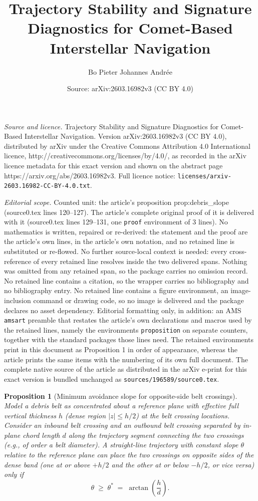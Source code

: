 \documentclass[10pt,a4paper]{amsart}
\title{Trajectory Stability and Signature Diagnostics for Comet-Based Interstellar Navigation}
\author{Bo Pieter Johannes Andr\'ee}
\date{Source: arXiv:2603.16982v3 (CC BY 4.0)}
\newtheorem{proposition}{Proposition}
\begin{document}
\maketitle

\noindent\emph{Source and licence.} Trajectory Stability and Signature Diagnostics for Comet-Based Interstellar Navigation. Version arXiv:2603.16982v3 (CC BY 4.0), distributed by arXiv under the Creative Commons Attribution 4.0 International licence, http://creativecommons.org/licenses/by/4.0/, as recorded in the arXiv licence metadata for this exact version and shown on the abstract page https://arxiv.org/abs/2603.16982v3. Full licence notice: \texttt{licenses/arxiv-2603.16982-CC-BY-4.0.txt}.\par\smallskip

\noindent\textit{Editorial scope.} Counted unit: the article's proposition prop:debris\_slope (source0.tex lines 120--127). The article's complete original proof of it is delivered with it (source0.tex lines 129--131, one \texttt{proof} environment of 3 lines). No mathematics is written, repaired or re-derived: the statement and the proof are the article's own lines, in the article's own notation, and no retained line is substituted or re-flowed.  No further source-local context is needed: every cross-reference of every retained line resolves inside the two delivered spans.  Nothing was omitted from any retained span, so the package carries no omission record.  No retained line contains a citation, so the wrapper carries no bibliography and no bibliography entry.  No retained line contains a figure environment, an image-inclusion command or drawing code, so no image is delivered and the package declares no asset dependency.  Editorial formatting only, in addition: an AMS \texttt{amsart} preamble that restates the article's own declarations and macros used by the retained lines, namely the environments \texttt{proposition} on separate counters, together with the standard packages those lines need.  The retained environments print in this document as Proposition 1 in order of appearance, whereas the article prints the same items with the numbering of its own full document.  The complete native source of the article as distributed in the arXiv e-print for this exact version is bundled unchanged as \texttt{sources/196589/source0.tex}.
\begin{proposition}[Minimum avoidance slope for opposite-side belt crossings]
\label{prop:debris_slope}
Model a debris belt as concentrated about a reference plane with effective full vertical thickness $h$ (dense region $|z|\le h/2$) at the belt crossing locations. Consider an inbound belt crossing and an outbound belt crossing separated by in-plane chord length $d$ along the trajectory segment connecting the two crossings (e.g., of order a belt diameter). A straight-line trajectory with constant slope $\theta$ relative to the reference plane can place the two crossings on opposite sides of the dense band (one at or above $+h/2$ and the other at or below $-h/2$, or vice versa) only if
\begin{equation}
\theta \;\ge\; \theta^* \;=\; \arctan\!\left(\frac{h}{d}\right).
\label{eq:min_slope}
\end{equation}
\end{proposition}
\end{document}
